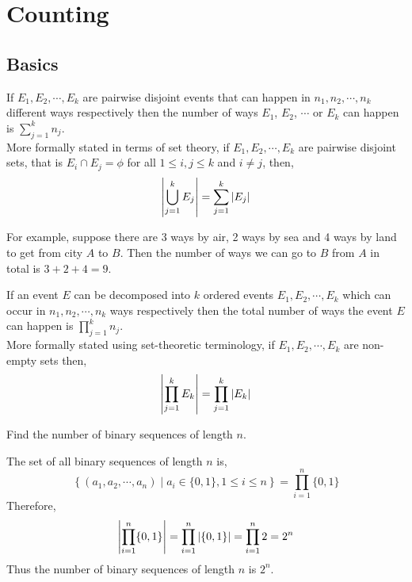 \chapter{Counting}

\section{Basics}

\begin{theorem}
    If $E_{1}, E_{2},\cdots, E_{k}$ are pairwise disjoint events that can happen in 
    $n_{1}, n_{2}, \cdots, n_{k}$ different ways respectively then the number of ways 
    $E_{1}$, $E_{2}$, $\cdots$ or $E_{k}$ can happen is $\sum_{j=1}^{k} n_{j}$. \\
    More formally stated in terms of set theory, 
    if $E_{1}, E_{2}, \cdots, E_{k}$ are pairwise disjoint sets, 
    that is $E_{i} \cap E_{j}=\phi$ for all $1\leq i,j \leq k$ and $i\neq j$, then,
    \[
        \left\lvert \bigcup_{j=1}^{k} E_{j} \right\rvert = \sum_{j=1}^{k} \left\lvert E_{j} \right\rvert
    \]
\end{theorem}

For example, suppose there are 3 ways by air, 2 ways by sea and 4 ways by land to get from 
city $A$ to $B$. Then the number of ways we can go to $B$ from $A$ in total is 
$3+2+4=9$.

\begin{theorem}
    If an event $E$ can be decomposed into $k$ ordered events 
    $E_{1}, E_{2}, \cdots, E_{k}$ which can occur in $n_{1}, n_{2}, \cdots, n_{k}$ 
    ways respectively then the total number of ways the event $E$ can happen is 
    $\prod_{j=1}^{k} n_{j}$. \\
    More formally stated using set-theoretic terminology, 
    if $E_{1}, E_{2}, \cdots, E_{k}$ are non-empty sets then,
    \[
        \left\lvert \prod_{j=1}^{k} E_{k} \right\rvert = \prod_{j=1}^{k} \left\lvert E_{k} \right\rvert
    \]
\end{theorem}

\begin{problem}
    Find the number of binary sequences of length $n$.
\end{problem}
\begin{sol}
    The set of all binary sequences of length $n$ is,
    \[
        \left\{ (a_{1}, a_{2}, \cdots, a_{n}) \mid a_{i}\in \{0,1\}, 1\leq i\leq n \right\} = 
        \prod_{i=1}^{n} \{0,1\}
    \]
    Therefore, 
    \begin{align*}
        \left\lvert \prod_{i=1}^{n} \{0,1\} \right\rvert = \prod_{i=1}^{n} \left\lvert \{0,1\} \right\rvert 
                                      = \prod_{i=1}^{n} 2 
                                      = 2^{n}
    \end{align*}
    Thus the number of binary sequences of length $n$ is $2^{n}$.
\end{sol}


